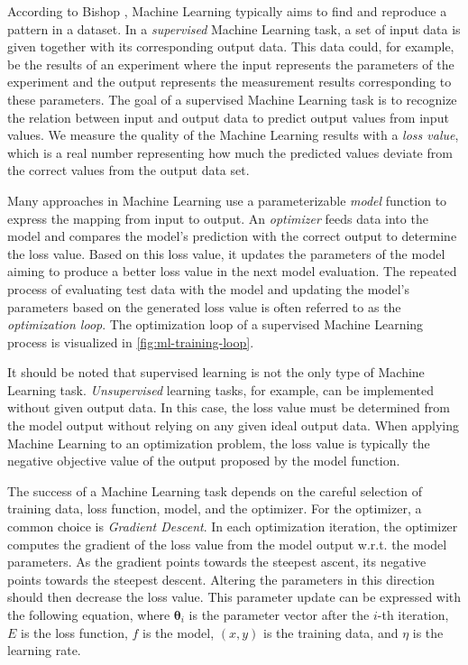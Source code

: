 According to Bishop \cite{bishop_pattern_2006}, Machine Learning typically aims
to find and reproduce a pattern in a dataset.
In a \emph{supervised} Machine Learning task, a set of input data is given
together with its corresponding output data.
This data could, for example, be the results of an experiment where the input
represents the parameters of the experiment and the output represents the
measurement results corresponding to these parameters.
The goal of a supervised Machine Learning task is to recognize the relation
between input and output data to predict output values from input values.
We measure the quality of the Machine Learning results with a
\emph{loss value}, which is a real number representing how much the predicted
values deviate from the correct values from the output data set.

Many approaches in Machine Learning use a parameterizable \emph{model} function
to express the mapping from input to output.
An \emph{optimizer} feeds data into the model and compares the model's
prediction with the correct output to determine the loss value.
Based on this loss value, it updates the parameters of the model aiming to
produce a better loss value in the next model evaluation. 
The repeated process of evaluating test data with the model and updating the
model's parameters based on the generated loss value is often referred to as the
\emph{optimization loop}.
The optimization loop of a supervised Machine Learning process is visualized in
\autoref{fig:ml-training-loop}.

It should be noted that supervised learning is not the only type of
Machine Learning task.
\emph{Unsupervised} learning tasks, for example, can be implemented without
given output data.
In this case, the loss value must be determined from the model output without
relying on any given ideal output data.
When applying Machine Learning to an optimization problem, the loss value is
typically the negative objective value of the output proposed by the model
function.

The success of a Machine Learning task depends on the careful selection of
training data, loss function, model, and the optimizer.
For the optimizer, a common choice is \emph{Gradient Descent}.
In each optimization iteration, the optimizer computes the gradient of the loss
value from the model output w.r.t. the model parameters.
As the gradient points towards the steepest ascent, its negative points towards
the steepest descent.
Altering the parameters in this direction should then decrease the loss value.
This parameter update can be expressed with the following equation, where
$\mathbf{\theta}_i$ is the parameter vector after the $i$-th iteration, $E$ is
the loss function, $f$ is the model, $(x,y)$ is the training data, and $\eta$ is
the learning rate.

